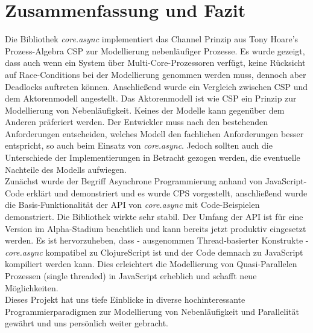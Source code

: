 \chapter{Zusammenfassung und Fazit}
Die Bibliothek \textit{core.async} implementiert das Channel Prinzip aus Tony Hoare's Prozess-Algebra \acf{CSP} zur Modellierung nebenläufiger Prozesse. Es wurde gezeigt, dass auch wenn ein System über Multi-Core-Prozessoren verfügt, keine Rücksicht auf Race-Conditions bei der Modellierung genommen werden muss, dennoch aber Deadlocks auftreten können. Anschließend wurde ein Vergleich zwischen \acs{CSP} und dem Aktorenmodell angestellt. Das Aktorenmodell ist wie \acs{CSP} ein Prinzip zur Modellierung von Nebenläufigkeit. Keines der Modelle kann gegenüber dem Anderen präferiert werden. Der Entwickler muss nach den bestehenden Anforderungen entscheiden, welches Modell den fachlichen Anforderungen besser entspricht, so auch beim Einsatz von \textit{core.async}. Jedoch sollten auch die Unterschiede der Implementierungen in Betracht gezogen werden, die eventuelle Nachteile des Modells aufwiegen.\\
Zunächst wurde der Begriff Asynchrone Programmierung anhand von JavaScript-Code erklärt und demonstriert und es wurde \acf{CPS} vorgestellt, anschließend wurde die Basis-Funktionalität der \acs{API} von \textit{core.async} mit Code-Beispielen demonstriert. Die Bibliothek wirkte sehr stabil. Der Umfang der \acs{API} ist für eine Version im Alpha-Stadium beachtlich und kann bereits jetzt produktiv eingesetzt werden. Es ist hervorzuheben, dass - ausgenommen Thread-basierter Konstrukte - \textit{core.async} kompatibel zu ClojureScript ist und der Code demnach zu JavaScript kompiliert werden kann. Dies erleichtert die Modellierung von Quasi-Parallelen Prozessen (single threaded) in JavaScript erheblich und schafft neue Möglichkeiten.\\
Dieses Projekt hat uns tiefe Einblicke in diverse hochinteressante Programmierparadigmen zur Modellierung von Nebenläufigkeit und Parallelität gewährt und uns persönlich weiter gebracht.

